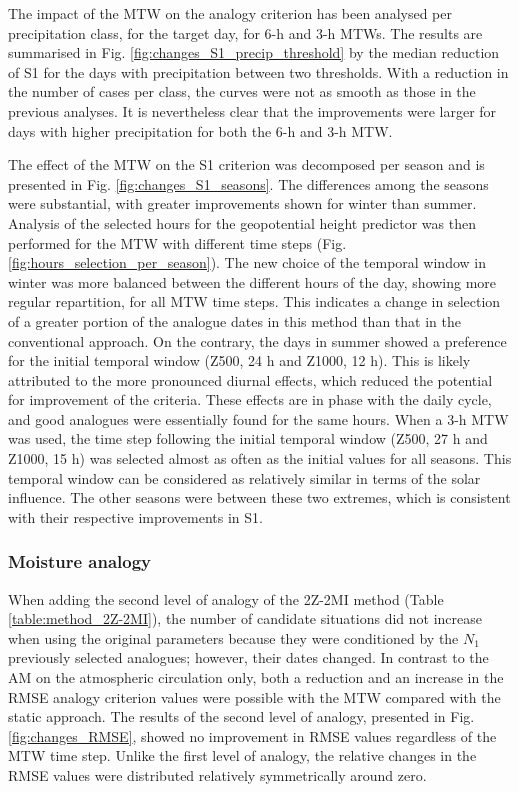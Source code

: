 \documentclass[hess, manuscript]{copernicus}
\begin{document}
	The impact of the MTW on the analogy criterion has been analysed per precipitation class, for the target day, for 6-h and 3-h MTWs. The results are summarised in Fig. \ref{fig:changes_S1_precip_threshold} by the median reduction of S1 for the days with precipitation between two thresholds. With a reduction in the number of cases per class, the curves were not as smooth as those in the previous analyses. It is nevertheless clear that the improvements were larger for days with higher precipitation for both the 6-h and 3-h MTW.
	
	The effect of the MTW on the S1 criterion was decomposed per season and is presented in Fig. \ref{fig:changes_S1_seasons}. The differences among the seasons were substantial, with greater improvements shown for winter than summer. Analysis of the selected hours for the geopotential height predictor was then performed for the MTW with different time steps (Fig. \ref{fig:hours_selection_per_season}). The new choice of the temporal window in winter was more balanced between the different hours of the day, showing more regular repartition, for all MTW time steps. This indicates a change in selection of a greater portion of the analogue dates in this method than that in the conventional approach. On the contrary, the days in summer showed a preference for the initial temporal window (Z500, 24 h and Z1000, 12 h). This is likely attributed to the more pronounced diurnal effects, which reduced the potential for improvement of the criteria. These effects are in phase with the daily cycle, and good analogues were essentially found for the same hours. When a 3-h MTW was used, the time step following the initial temporal window (Z500, 27 h and Z1000, 15 h) was selected almost as often as the initial values for all seasons. This temporal window can be considered as relatively similar in terms of the solar influence. The other seasons were between these two extremes, which is consistent with their respective improvements in S1.
	
	
	\subsubsection{Moisture analogy}
	\label{sec:changes_analogy_moisture}
	
	When adding the second level of analogy of the 2Z-2MI method (Table \ref{table:method_2Z-2MI}), the number of candidate situations did not increase when using the original parameters because they were conditioned by the $N_{1}$ previously selected analogues; however, their dates changed. In contrast to the AM on the atmospheric circulation only, both a reduction and an increase in the RMSE analogy criterion values were possible with the MTW compared with the static approach. The results of the second level of analogy, presented in Fig. \ref{fig:changes_RMSE}, showed no improvement in RMSE values regardless of the MTW time step. Unlike the first level of analogy, the relative changes in the RMSE values were distributed relatively symmetrically around zero.
	
\end{document}
